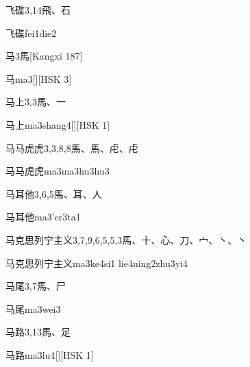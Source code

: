 \begin{entry}{飞碟}{3,14}{⾶、⽯}
  \begin{phonetics}{飞碟}{fei1die2}
  \end{phonetics}
\end{entry}

\begin{entry}{马}{3}{⾺}[Kangxi 187]
  \begin{phonetics}{马}{ma3}[][HSK 3]
  \end{phonetics}
\end{entry}

\begin{entry}{马上}{3,3}{⾺、⼀}
  \begin{phonetics}{马上}{ma3shang4}[][HSK 1]
  \end{phonetics}
\end{entry}

\begin{entry}{马马虎虎}{3,3,8,8}{⾺、⾺、⾌、⾌}
  \begin{phonetics}{马马虎虎}{ma3ma3hu3hu3}
  \end{phonetics}
\end{entry}

\begin{entry}{马耳他}{3,6,5}{⾺、⽿、⼈}
  \begin{phonetics}{马耳他}{ma3'er3ta1}
  \end{phonetics}
\end{entry}

\begin{entry}{马克思列宁主义}{3,7,9,6,5,5,3}{⾺、⼗、⼼、⼑、⼧、⼂、⼂}
  \begin{phonetics}{马克思列宁主义}{ma3ke4si1 lie4ning2zhu3yi4}
  \end{phonetics}
\end{entry}

\begin{entry}{马尾}{3,7}{⾺、⼫}
  \begin{phonetics}{马尾}{ma3wei3}
  \end{phonetics}
\end{entry}

\begin{entry}{马路}{3,13}{⾺、⾜}
  \begin{phonetics}{马路}{ma3lu4}[][HSK 1]
  \end{phonetics}
\end{entry}


